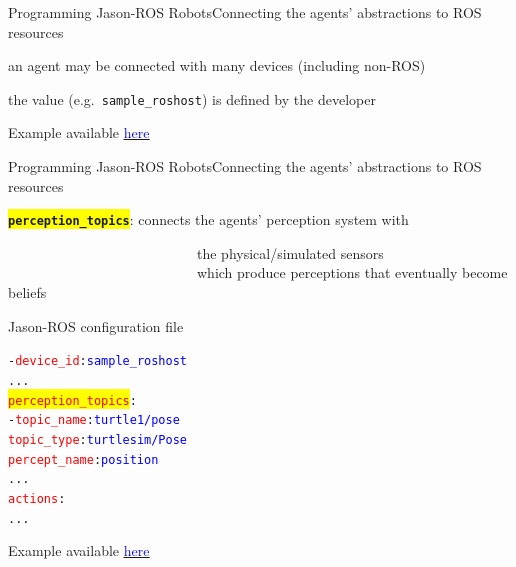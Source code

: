 \documentclass[compress]{beamer}
\newcommand{\yamlkey}[1]{\textcolor{red}{\texttt{#1}}}
\newcommand{\yamlvalue}[1]{\textcolor{blue}{\texttt{#1}}}
\newcommand{\link}[2]{\href{#1}{\underline{\textcolor{blue}{#2}}}}
\begin{document}
\begin{frame}[fragile]{Programming Jason-ROS Robots}{Connecting the agents' abstractions to ROS resources}
  
    \vspace{.3cm}
  
    an agent may be connected with many devices {\tiny (including non-ROS)}\\ \vspace{-.2cm}
  
    the value (e.g.~\texttt{sample\_roshost}) is defined by the developer
    
    
     \vfill
    {\tiny Example available \link{https://github.com/issia-2026-jason-ros/turtle-example/blob/master/src/agt/robot1.yaml}{here}}
\end{frame}


\begin{frame}[fragile]{Programming Jason-ROS Robots}{Connecting the agents' abstractions to ROS resources}

\footnotesize
\colorbox{yellow}{\texttt{{\bf perception\_topics}}}: %
connects the agents' perception system with\\ 

\vspace{-.47cm}

\ \ \ \ \ \ \ \ \ \ \ \ \ \ \ \ \ \ \ \ \ \ \ \ \ \ \ the physical/simulated sensors\\

\vspace{-.5cm}
\ \ \ \ \ \ \ \ \ \ \ \ \ \ \ \ \ \ \ \ \ \ \ \ \ \ \ {\tiny which produce perceptions that eventually become beliefs}

\vspace{.5em}

\begin{block}{{\scriptsize Jason-ROS configuration file}}
\vspace{-.5cm}    
\begin{alltt}  \scriptsize
- \yamlkey{device\_id}: \yamlvalue{sample_roshost}         
     ...
  \colorbox{yellow}{\yamlkey{perception_topics}}:         
      - \yamlkey{topic_name}: \yamlvalue{turtle1/pose}
        \yamlkey{topic_type}: \yamlvalue{turtlesim/Pose}
        \yamlkey{percept_name}: \yamlvalue{position} 
      ...
  \yamlkey{actions}:       
     ...    
\end{alltt}
\end{block}         
\vfill
    {\tiny Example available \link{https://github.com/issia-2026-jason-ros/turtle-example/blob/master/src/agt/robot1.yaml}{here}}
\end{frame}
\end{document}
